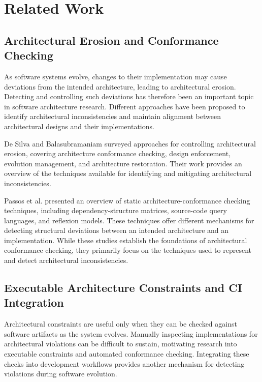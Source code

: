 \section{Related Work}

\subsection{Architectural Erosion and Conformance Checking}

As software systems evolve, changes to their implementation may
cause deviations from the intended architecture, leading to
architectural erosion. Detecting and controlling such deviations
has therefore been an important topic in software architecture
research. Different approaches have been proposed to identify
architectural inconsistencies and maintain alignment between
architectural designs and their implementations.

De Silva and Balasubramaniam \cite{desilva2012}
surveyed approaches for controlling architectural erosion,
covering architecture conformance checking, design enforcement,
evolution management, and architecture restoration. Their work
provides an overview of the techniques available for identifying
and mitigating architectural inconsistencies.

Passos et al. \cite{passos2010} presented an overview of
static architecture-conformance checking techniques, including
dependency-structure matrices, source-code query languages, and
reflexion models. These techniques offer different mechanisms
for detecting structural deviations between an intended
architecture and an implementation. While these studies establish
the foundations of architectural conformance checking, they
primarily focus on the techniques used to represent and detect
architectural inconsistencies.

\subsection{Executable Architecture Constraints and CI Integration}

Architectural constraints are useful only when they can be
checked against software artifacts as the system evolves.
Manually inspecting implementations for architectural violations
can be difficult to sustain, motivating research into executable
constraints and automated conformance checking. Integrating these
checks into development workflows provides another mechanism
for detecting violations during software evolution.

